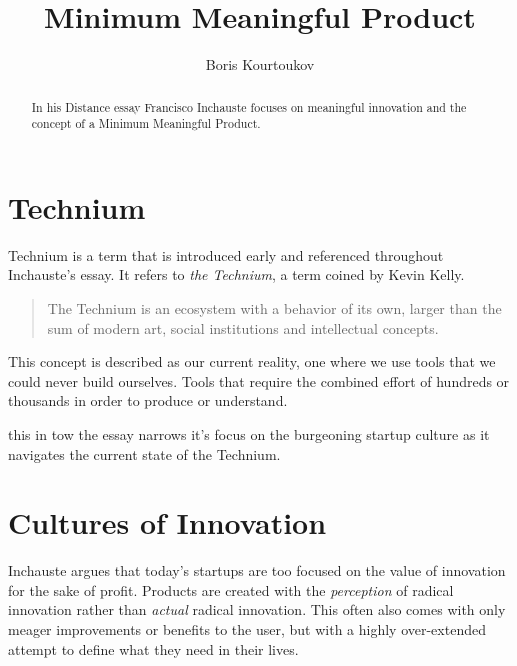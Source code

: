 
\title{Minimum Meaningful Product}
\author{Boris Kourtoukov}
\date{}


\maketitle
\vspace{1cm}
\tableofcontents
\newpage

\begin{abstract}
\noindent
In his Distance essay Francisco Inchauste focuses on meaningful innovation and the concept of a Minimum Meaningful Product.
\end{abstract}

\section{Technium}

Technium is a term that is introduced early and referenced throughout Inchauste's essay. It refers to \textit{the Technium}, a term coined by Kevin Kelly.

\begin{quote}
	The Technium is an ecosystem with a behavior of its own, larger than the sum of modern art, social institutions and intellectual concepts.\cite{Herzog}
\end{quote}

This concept is described as our current reality, one where we use tools that we could never build ourselves. Tools that require the combined effort of hundreds or thousands in order to produce or understand. 

 this in tow the essay narrows it's focus on the burgeoning startup culture as it navigates the current state of the Technium. 


\section{Cultures of Innovation}

Inchauste argues that today's startups are too focused on the value of innovation for the sake of profit. Products are created with the \textit{perception} of radical innovation rather than \textit{actual} radical innovation. This often also comes with only meager improvements or benefits to the user, but with a highly over-extended attempt to define what they need in their lives.


